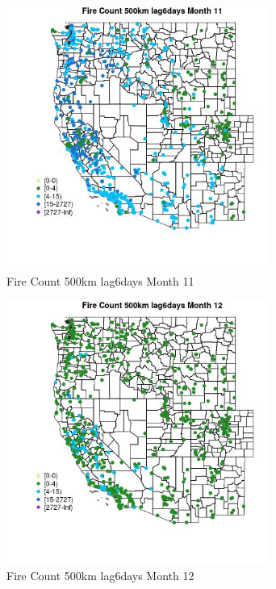 \begin{figure} 
\centering  
\includegraphics[width=0.77\textwidth]{Code_Outputs/Report_ML_input_PM25_Step4_part_f_de_duplicated_aveswNAs_MapObsMo11Fire_Count_500km_lag6days.jpg} 
\caption{\label{fig:Report_ML_input_PM25_Step4_part_f_de_duplicated_aveswNAsMapObsMo11Fire_Count_500km_lag6days}Fire Count 500km lag6days Month 11} 
\end{figure} 
 

\begin{figure} 
\centering  
\includegraphics[width=0.77\textwidth]{Code_Outputs/Report_ML_input_PM25_Step4_part_f_de_duplicated_aveswNAs_MapObsMo12Fire_Count_500km_lag6days.jpg} 
\caption{\label{fig:Report_ML_input_PM25_Step4_part_f_de_duplicated_aveswNAsMapObsMo12Fire_Count_500km_lag6days}Fire Count 500km lag6days Month 12} 
\end{figure} 
 

